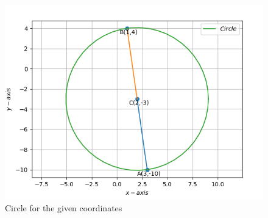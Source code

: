 \documentclass[12pt]{article}
\begin{document}
\begin{enumerate}
\begin{figure}[!h]
\begin{center}
	\includegraphics[width=\columnwidth]{./figs/Vector1.png}
\end{center}
\caption{Circle for the given coordinates}
\label{fig:Fig}
\end{figure}
\end{enumerate}
\end{document}
